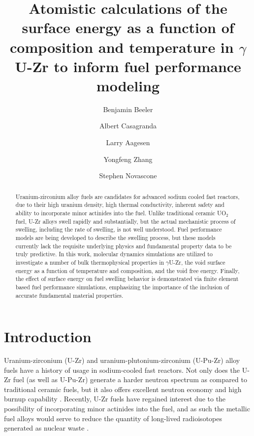 \documentclass[review]{elsarticle}
\begin{document}
\begin{frontmatter}
\title{Atomistic calculations of the surface energy as a function of composition and temperature in $\gamma$ U-Zr to inform fuel performance modeling}


\author[inl]{Benjamin Beeler}
\author[inl]{Albert Casagranda}
\author[inl]{Larry Aagesen}
\author[inl]{Yongfeng Zhang}
\author[inl]{Stephen Novascone}
\address[inl]{Idaho National Laboratory, Idaho Falls, ID 83415}


\begin{abstract}

Uranium-zirconium alloy fuels are candidates for advanced sodium cooled fast reactors, due to their high uranium density, high thermal conductivity, inherent safety and ability to incorporate minor actinides into the fuel. Unlike traditional ceramic UO$_2$ fuel, U-Zr alloys swell rapidly and substantially, but the actual mechanistic process of swelling, including the rate of swelling, is not well understood. Fuel performance models are being developed to describe the swelling process, but these models currently lack the requisite underlying physics and fundamental property data to be truly predictive. In this work, molecular dynamics simulations are utilized to investigate a number of bulk thermophysical properties in  $\gamma$U-Zr, the void surface energy as a function of temperature and composition, and the void free energy. Finally, the effect of surface energy on fuel swelling behavior is demonstrated via finite element based fuel performance simulations, emphasizing the importance of the inclusion of accurate fundamental material properties. 


\end{abstract}
\end{frontmatter}

\linenumbers
\modulolinenumbers[5]

\section{Introduction}

Uranium-zirconium (U-Zr) and uranium-plutonium-zirconium (U-Pu-Zr) alloy fuels have a history of usage in sodium-cooled fast reactors. Not only does the U-Zr fuel (as well as U-Pu-Zr) generate a harder neutron spectrum as compared to traditional ceramic fuels, but it also offers excellent neutron economy and high burnup capability \cite{hofman1997}. Recently, U-Zr fuels have regained interest due to the possibility of incorporating minor actinides into the fuel, and as such the metallic fuel alloys would serve to reduce the quantity of long-lived radioisotopes generated as nuclear waste \cite{capriotti2017}. 
\end{document}
